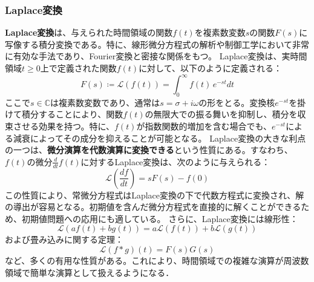 \subsubsection{Laplace変換}
\textbf{Laplace変換}は、与えられた時間領域の関数$f(t)$を複素数変数$s$の関数$F(s)$に写像する積分変換である。特に、線形微分方程式の解析や制御工学において非常に有効な手法であり、Fourier変換と密接な関係をもつ。
Laplace変換は、実時間領域$t \ge 0$上で定義された関数$f(t)$に対して、以下のように定義される：
\begin{equation}
F(s) \coloneqq \mathscr{L}(f(t)) = \int_0^{\infty} f(t)\, e^{-st} dt
\end{equation}
ここで$s \in \mathbb{C}$は複素数変数であり、通常は$s = \sigma + i\omega$の形をとる。変換核$e^{-st}$を掛けて積分することにより、関数$f(t)$の無限大での振る舞いを抑制し、積分を収束させる効果を持つ。特に、$f(t)$が指数関数的増加を含む場合でも、$e^{-st}$による減衰によってその成分を抑えることが可能となる。
Laplace変換の大きな利点の一つは、\textbf{微分演算を代数演算に変換できる}という性質にある。すなわち、$f(t)$の微分$\frac{d}{dt}f(t)$に対するLaplace変換は、次のように与えられる：
\begin{equation}
\mathscr{L}\left(\frac{df}{dt}\right) = sF(s) - f(0)
\end{equation}
この性質により、常微分方程式はLaplace変換の下で代数方程式に変換され、解の導出が容易となる。初期値を含んだ微分方程式を直接的に解くことができるため、初期値問題への応用にも適している。
さらに、Laplace変換には線形性：
\begin{equation}
\mathscr{L}(af(t) + bg(t)) = a\mathscr{L}(f(t)) + b\mathscr{L}(g(t))
\end{equation}
および畳み込みに関する定理：
\begin{equation}
\mathscr{L}(f * g)(t) = F(s)G(s)
\end{equation}
など、多くの有用な性質がある。これにより、時間領域での複雑な演算が周波数領域で簡単な演算として扱えるようになる．
